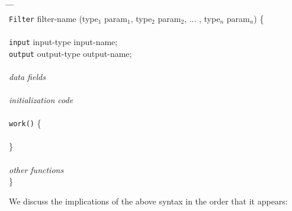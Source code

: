 \documentclass[draft]{article}
\begin{document}
\begin{tabbing}
\hspace{0.2in} \= \hspace{0.2in} \= \hspace{0.2in} \= \hspace{0.2in} \= \\

{\tt Filter} filter-name (type$_1$ param$_1$, type$_2$ param$_2$,
... , type$_n$ param$_n$) \{ \\ \\

\> {\tt input} input-type input-name; \\
\> {\tt output} output-type output-name; \\ \\

\> {\it data fields} \\ \\

\> {\it initialization code} \\ \\

\> {\tt work()} \{ \\ \\
\> \} \\ \\

\> {\it other functions} \\

\}
\end{tabbing}

We discuss the implications of the above syntax in the order that it
appears:
\end{document}
